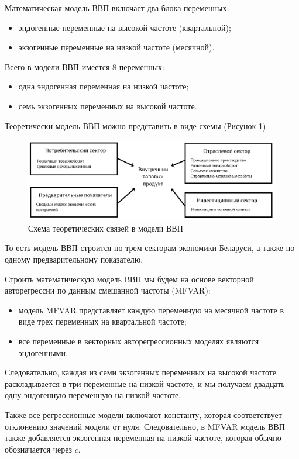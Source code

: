 \documentclass[a4paper, 14pt]{extreport}
\numberwithin{equation}{section}
\numberwithin{equation}{section}
\begin{document}
	Математическая модель ВВП включает два блока переменных:
	\begin{itemize}
		\item эндогенные переменные на высокой частоте (квартальной);
		\item экзогенные переменные на низкой частоте (месячной).
	\end{itemize}
	
	Всего в модели ВВП имеется $8$ переменных:
	\begin{itemize}
		\item одна эндогенная переменная на низкой частоте;
		\item семь экзогенных переменных на высокой частоте.
	\end{itemize}
	Теоретически модель ВВП можно представить в виде схемы (Рисунок \ref{fig:image41}).
	\begin{figure}[h!]
		\centering
		\includegraphics[scale=0.35]{images/image41}
		\caption{Схема теоретических связей в модели ВВП}
		\label{fig:image41}
	\end{figure}
	То есть модель ВВП строится по трем секторам экономики Беларуси, а также по одному предварительному показателю. 
	
	Строить математическую модель ВВП мы будем на основе векторной авторегрессии по данным смешанной частоты (MFVAR):
	\begin{itemize}
		\item  модель MFVAR представляет каждую переменную на месячной частоте в виде трех переменных на квартальной частоте;
		\item все переменные в векторных авторегрессионных моделях являются эндогенными.
	\end{itemize}
	Следовательно, каждая из семи экзогенных переменных на высокой частоте раскладывается в три переменные на низкой частоте, и мы получаем двадцать одну эндогенную переменную на низкой частоте.
	
	Также все регрессионные модели включают константу, которая соответствует отклонению значений модели от нуля. Следовательно, в MFVAR модель ВВП также добавляется экзогенная переменная на низкой частоте, которая обычно обозначается через $c$.
	
\end{document}
